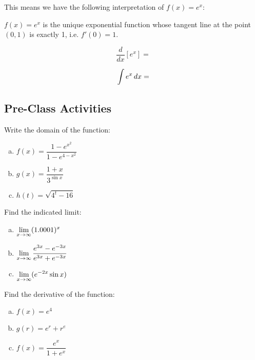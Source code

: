 \documentclass[notes]{subfiles}
\begin{document}
		This means we have the following interpretation of $f(x) = e^x$:
		\begin{rmk}
			$f(x) = e^x$ is the unique exponential function whose tangent line at the point $(0,1)$ is exactly 1, i.e. $f'(0) = 1$.
		\end{rmk}
		
		\begin{rmk}[Derivative of $e^x$]
			\[\dfrac{d}{dx}\left[e^x\right] = \]
		\end{rmk}
		
		\begin{rmk}[Antiderivative of $e^x$]
			\[\displaystyle \int e^x\, dx = \]
		\end{rmk}
			\newpage
			
	\subsection*{Pre-Class Activities}
		\begin{ex}
			Write the domain of the function:
			\begin{enumerate}[(a)]
				\item $f(x) = \dfrac{1-e^{x^2}}{1-e^{4-x^2}}$
					
				\item $g(x) = \dfrac{1+x}{3^{\sin x}}$
					
				\item $h(t) = \sqrt{4^t - 16}$
					
			\end{enumerate}	
		\end{ex}
		
		\begin{ex}
			Find the indicated limit:
			\begin{enumerate}[(a)]
				\item $\displaystyle \lim_{x\to \infty} (1.0001)^x$
					\vs{.5}
					
				\item $\displaystyle \lim_{x\to \infty} \dfrac{e^{3x}-e^{-3x}}{e^{3x} + e^{-3x}}$
					\vs{.5}
					
				\item $\displaystyle \lim_{x\to \infty} (e^{-2x}\sin x)$
					\vs{.5}
			\end{enumerate}
		\end{ex}
		\newpage
		
		\begin{ex}
			Find the derivative of the function:
			\begin{enumerate}[(a)]
				\item $f(x) = e^4$
					\vs{1}
					
				\item $g(r) = e^r + r^e$
					\vs{1}
					
				\item $f(x) = \dfrac{e^x}{1+e^x}$
					\vs{1}
			\end{enumerate}
		\end{ex}
		
\end{document}
